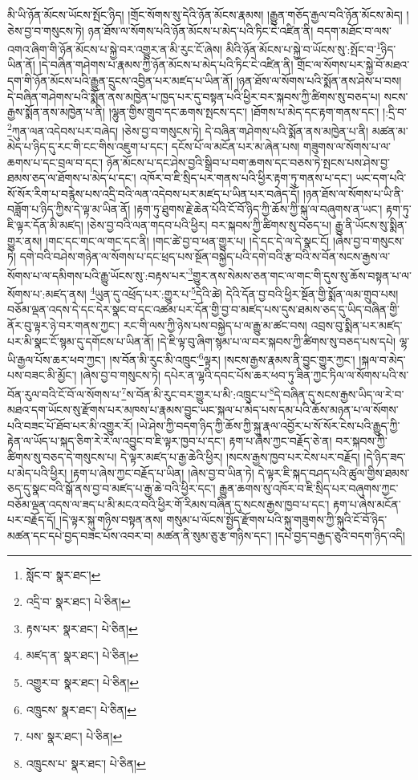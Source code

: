 མི་ཡི་ཉོན་མོངས་ཡོངས་སྤོང་ཉིད། །གྲོང་སོགས་སུ་དེའི་ཉོན་མོངས་རྣམས། །རྒྱུན་གཅོད་རྒྱལ་བའི་ཉོན་མོངས་མེད། །ཅེས་བྱ་བ་གསུངས་ཏེ། ཉན་ཐོས་ལ་སོགས་པའི་ཉོན་མོངས་པ་མེད་པའི་ཏིང་ངེ་འཛིན་ནི། བདག་མཐོང་བ་ལས་འགའ་ཞིག་གི་ཉོན་མོངས་པ་སྐྱེ་བར་འགྱུར་ན་མི་རུང་ངོ་ཞེས། མིའི་ཉོན་མོངས་པ་སྐྱེ་བ་ཡོངས་སུ་:སྤོང་བ་\footnote{སློང་བ་  སྣར་ཐང་། }ཉིད་ཡིན་ནོ། །དེ་བཞིན་གཤེགས་པ་རྣམས་ཀྱི་ཉོན་མོངས་པ་མེད་པའི་ཏིང་ངེ་འཛིན་ནི། གྲོང་ལ་སོགས་པར་སྐྱེ་བོ་མཐའ་དག་གི་ཉོན་མོངས་པའི་རྒྱུན་དྲུངས་འབྱིན་པར་མཛད་པ་ཡིན་ནོ། །ཉན་ཐོས་ལ་སོགས་པའི་སྨོན་ནས་ཤེས་པ་བས། དེ་བཞིན་གཤེགས་པའི་སྨོན་ནས་མཁྱེན་པ་ཁྱད་པར་དུ་བསྟན་པའི་ཕྱིར་བར་སྐབས་ཀྱི་ཚིགས་སུ་བཅད་པ། སངས་རྒྱས་སྨོན་ནས་མཁྱེན་པ་ནི། །ལྷུན་གྱིས་གྲུབ་དང་ཆགས་སྤངས་དང་། །ཐོགས་པ་མེད་དང་རྟག་གནས་དང་། །:དྲི་བ་\footnote{འདྲི་བ་  སྣར་ཐང་།  པེ་ཅིན། }ཀུན་ལན་འདེབས་པར་བཞེད། །ཅེས་བྱ་བ་གསུངས་ཏེ། དེ་བཞིན་གཤེགས་པའི་སྨོན་ནས་མཁྱེན་པ་ནི། མཚན་མ་མེད་པ་ཉིད་དུ་རང་གི་ངང་གིས་འཇུག་པ་དང་། དངོས་པོ་ལ་མངོན་པར་མ་ཞེན་པས། གཟུགས་ལ་སོགས་པ་ལ་ཆགས་པ་དང་བྲལ་བ་དང་། ཉོན་མོངས་པ་དང་ཤེས་བྱའི་སྒྲིབ་པ་བག་ཆགས་དང་བཅས་ཏེ་སྤངས་པས་ཤེས་བྱ་ཐམས་ཅད་ལ་ཐོགས་པ་མེད་པ་དང་། འཁོར་བ་ཇི་སྲིད་པར་གནས་པའི་ཕྱིར་རྟག་ཏུ་གནས་པ་དང་། ཡང་དག་པའི་སོ་སོར་རིག་པ་བརྙེས་པས་འདྲི་བའི་ལན་འདེབས་པར་མཛད་པ་ཡིན་པར་བཞེད་དོ། །ཉན་ཐོས་ལ་སོགས་པ་ཡི་ནི་བཟློག་པ་ཉིད་ཀྱིས་དེ་ལྟ་མ་ཡིན་ནོ། །རྟག་ཏུ་ཐུགས་རྗེ་ཆེན་པོའི་ངོ་བོ་ཉིད་ཀྱི་ཆོས་ཀྱི་སྐུ་ལ་བཞུགས་ན་ཡང་། རྟག་ཏུ་ཇི་ལྟར་དོན་མི་མཛད། །ཅེས་བྱ་བའི་ལན་གདབ་པའི་ཕྱིར། བར་སྐབས་ཀྱི་ཚིགས་སུ་བཅད་པ། རྒྱུ་ནི་ཡོངས་སུ་སྨིན་གྱུར་ནས། །གང་དང་གང་ལ་གང་དང་ནི། །གང་ཚེ་བྱ་བ་ཕན་གྱུར་པ། །དེ་དང་དེ་ལ་དེ་སྣང་ངོ། །ཞེས་བྱ་བ་གསུངས་ཏེ། དགེ་བའི་བཤེས་གཉེན་ལ་སོགས་པ་དང་ཕྲད་པས་སྔོན་བསྐྱེད་པའི་དགེ་བའི་རྩ་བའི་ས་བོན་སངས་རྒྱས་ལ་སོགས་པ་ལ་དམིགས་པའི་རྒྱུ་ཡོངས་སུ་:བརྟས་པར་\footnote{རྟས་པར་  སྣར་ཐང་།  པེ་ཅིན། }གྱུར་ནས་སེམས་ཅན་གང་ལ་གང་གི་དུས་སུ་ཆོས་བསྟན་པ་ལ་སོགས་པ་:མཛད་ནས། \footnote{མཛད་ན་  སྣར་ཐང་།  པེ་ཅིན། }ཡུན་དུ་འཕྲོད་པར་:གྱུར་པ་\footnote{འགྱུར་བ་  སྣར་ཐང་།  པེ་ཅིན། }དེའི་ཚེ། དེའི་དོན་བྱ་བའི་ཕྱིར་སྔོན་གྱི་སྨོན་ལམ་གྲུབ་པས། བཅོམ་ལྡན་འདས་དེ་དང་དེར་སྣང་བ་དང་འཚམ་པར་དོན་གྱི་བྱ་བ་མཛད་པས་དུས་ཐམས་ཅད་དུ་ཡིད་བཞིན་གྱི་ནོར་བུ་ལྟར་ཉེ་བར་གནས་ཀྱང་། རང་གི་ལས་ཀྱི་ཉེས་པས་བསྐྱེད་པ་ལ་རྒྱུ་མ་ཚང་བས། འབྲས་བུ་སྨིན་པར་མཛད་པར་མི་སྣང་ངོ་སྙམ་དུ་དགོངས་པ་ཡིན་ནོ། །དེ་ཇི་ལྟ་བུ་ཞིག་སྙམ་པ་ལ་བར་སྐབས་ཀྱི་ཚིགས་སུ་བཅད་པས་དཔེ། ལྷ་ཡི་རྒྱལ་པོས་ཆར་ཕབ་ཀྱང་། །ས་བོན་མི་རུང་མི་འཁྲུང་\footnote{འཁྲུངས་  སྣར་ཐང་།  པེ་ཅིན། }ལྟར། །སངས་རྒྱས་རྣམས་ནི་བྱུང་གྱུར་ཀྱང་། །སྐལ་བ་མེད་པས་བཟང་མི་མྱོང་། །ཞེས་བྱ་བ་གསུངས་ཏེ། དཔེར་ན་ལྷའི་དབང་པོས་ཆར་ཕབ་ཏུ་ཟིན་ཀྱང་ཏིལ་ལ་སོགས་པའི་ས་བོན་རུལ་བའི་ངོ་བོ་ལ་སོགས་པ་\footnote{པས་  སྣར་ཐང་།  པེ་ཅིན། }ས་བོན་མི་རུང་བར་གྱུར་པ་མི་:འཁྲུང་པ་\footnote{འཁྲུངས་པ་  སྣར་ཐང་།  པེ་ཅིན། }དེ་བཞིན་དུ་སངས་རྒྱས་ཡིད་ལ་རེ་བ་མཐའ་དག་ཡོངས་སུ་རྫོགས་པར་མཁས་པ་རྣམས་བྱུང་ཡང་སྐལ་པ་མེད་པས་དམ་པའི་ཆོས་མཉན་པ་ལ་སོགས་པའི་བཟང་པོ་ཐོབ་པར་མི་འགྱུར་རོ། །ཡེ་ཤེས་ཀྱི་བདག་ཉིད་ཀྱི་ཆོས་ཀྱི་སྐུ་རྣལ་འབྱོར་པ་སོ་སོར་ངེས་པའི་རྒྱུད་ཀྱི་རྟེན་ལ་ཡོད་པ་སྐད་ཅིག་རེ་རེ་ལ་འབྱུང་བ་ཇི་ལྟར་ཁྱབ་པ་དང་། རྟག་པ་ཞེས་ཀྱང་བརྗོད་ཅེ་ན། བར་སྐབས་ཀྱི་ཚིགས་སུ་བཅད་དེ་གསུངས་པ། དེ་ལྟར་མཛད་པ་རྒྱ་ཆེའི་ཕྱིར། །སངས་རྒྱས་ཁྱབ་པར་ངེས་པར་བརྗོད། །དེ་ཉིད་ཟད་པ་མེད་པའི་ཕྱིར། །རྟག་པ་ཞེས་ཀྱང་བརྗོད་པ་ཡིན། །ཞེས་བྱ་བ་ཡིན་ཏེ། དེ་ལྟར་ཇི་སྐད་བཤད་པའི་ཚུལ་གྱིས་ཐམས་ཅད་དུ་སྣང་བའི་སྒོ་ནས་བྱ་བ་མཛད་པ་རྒྱ་ཆེ་བའི་ཕྱིར་དང་། རྒྱུན་ཆགས་སུ་འཁོར་བ་ཇི་སྲིད་པར་བཞུགས་ཀྱང་བཅོམ་ལྡན་འདས་ལ་ཟད་པ་མི་མངའ་བའི་ཕྱིར་གོ་རིམས་བཞིན་དུ་སངས་རྒྱས་ཁྱབ་པ་དང་། རྟག་པ་ཞེས་མངོན་པར་བརྗོད་དོ། །དེ་ལྟར་སྐུ་གཉིས་བསྟན་ནས། གསུམ་པ་ལོངས་སྤྱོད་རྫོགས་པའི་སྐུ་གཟུགས་ཀྱི་སྐུའི་ངོ་བོ་ཉིད་མཚན་དང་དཔེ་བྱད་བཟང་པོས་འབར་བ། མཚན་ནི་སུམ་ཅུ་རྩ་གཉིས་དང་། །དཔེ་བྱད་བརྒྱད་ཅུའི་བདག་ཉིད་འདི། 